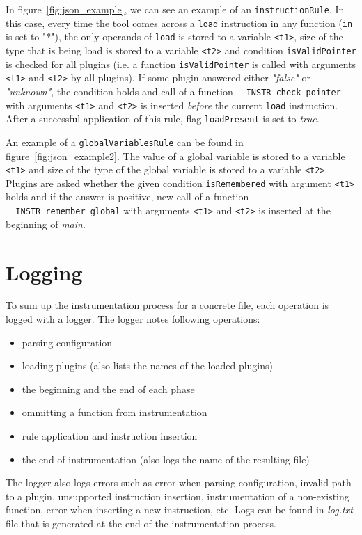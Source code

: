 In figure~\ref{fig:json_example}, we can see an example of an
\texttt{instructionRule}. In this case, every time the tool comes across a
\texttt{load} instruction in any function (\texttt{in} is set to "*"), the only
operands of \texttt{load} is stored to a variable \texttt{<t1>}, size of the
type that is being load is stored to a variable \texttt{<t2>} and condition
\texttt{isValidPointer} is checked for all plugins (i.e. a function
\texttt{isValidPointer} is called with arguments \texttt{<t1>} and
\texttt{<t2>} by all plugins). If some plugin answered either \emph{"false"} or
\emph{"unknown"}, the condition holds and call of a function
\texttt{\_\_INSTR\_check\_pointer} with arguments \texttt{<t1>} and
\texttt{<t2>} is inserted \emph{before} the current \texttt{load} instruction.
After a successful application of this rule, flag \texttt{loadPresent} is set
to \emph{true}.

An example of a \texttt{globalVariablesRule} can be found in
figure~\ref{fig:json_example2}. The value of a global variable is stored to a
variable \texttt{<t1>} and size of the type of the global variable is stored to
a variable \texttt{<t2>}. Plugins are asked whether the given condition
\texttt{isRemembered} with argument \texttt{<t1>} holds and if the answer is
positive, new call of a function \texttt{\_\_INSTR\_remember\_global} with
arguments \texttt{<t1>} and \texttt{<t2>} is inserted at the beginning of
\emph{main}.

\section{Logging}

To sum up the instrumentation process for a concrete file, each operation is
logged with a logger. The logger notes following operations:
\begin{itemize}
  \item parsing configuration
  \item loading plugins (also lists the names of the loaded plugins)
  \item the beginning and the end of each phase
  \item ommitting a function from instrumentation
  \item rule application and instruction insertion
  \item the end of instrumentation (also logs the name of the resulting file)
\end{itemize}
The logger also logs errors such as error when parsing configuration, invalid
path to a plugin, unsupported instruction insertion, instrumentation of a
non-existing function, error when inserting a new instruction, etc. Logs can be
found in \emph{log.txt} file that is generated at the end of the
instrumentation process.

